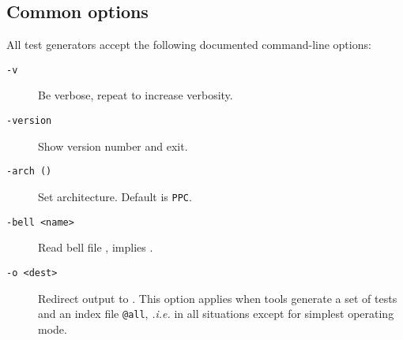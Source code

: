 \subsection{Common options}
All test generators accept the following documented
command-line options:
\begin{description}
\item[{\tt -v}] Be verbose, repeat to increase verbosity.
\item[{\tt -version}]  Show version number and exit.
\item[{\tt -arch (\allarch)}] Set architecture. Default is \texttt{PPC}.
\item[{\tt -bell <name>}]  Read bell file ,
implies .
\item[{\tt -o <dest>}]
Redirect output to .
This option applies when tools generate a set of tests and
an index file \texttt{@all}, \emph{.i.e.} in all situations
except for \diyone{} simplest operating mode.


\end{description}
